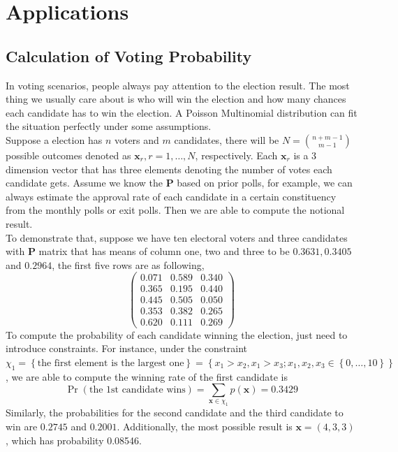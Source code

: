 \documentclass[12pt]{article}
\newcommand{\Pmat}{\mathbf{P}}
\newcommand{\xvec}{\boldsymbol{x}}
\begin{document}
\section{Applications}
\subsection{Calculation of Voting Probability}

  In voting scenarios, people always pay attention to the election result. The most thing we usually care about is who will win the election and how many chances each candidate has to win the election. A Poisson Multinomial distribution can fit the situation perfectly under some assumptions.\\

Suppose a election has $n$ voters and $m$ candidates, there will be $N = \binom{n+m-1}{m-1}$ possible outcomes denoted as $\boldsymbol{x}_r, r = 1, \dots, N$, respectively. Each $\xvec_r$ is a 3 dimension vector that has three elements denoting the number of votes each candidate gets. Assume we know the $\Pmat$ based on prior polls, for example, we can always estimate the approval rate of each candidate in a certain constituency from the monthly polls or exit polls. Then we are able to compute the notional result.\\

To demonstrate that, suppose we have ten electoral voters and three candidates with $\Pmat$ matrix that has means of column one, two and three to be $0.3631,0.3405$ and $0.2964$, the first five rows are as following,
\begin{equation*}
\begin{pmatrix}
0.071 & 0.589 & 0.340\\
0.365 & 0.195 & 0.440\\
0.445 & 0.505 & 0.050\\
0.353 & 0.382 & 0.265\\
0.620 & 0.111 & 0.269
    \end{pmatrix}
\end{equation*}
To compute the probability of each candidate winning the election, just need to introduce constraints. For instance, under the constraint $\chi_1 = \left\{\text{the first element is the largest one}\right\} = \left\{x_1>x_2, x_1>x_3; x_1, x_2,x_3 \in \left\{0,\dots,10\right\}\right\}$, we are able to compute the winning rate of the first candidate is
\begin{equation*}
\Pr(\text{the 1st candidate wins}) = \sum_{\boldsymbol{x} \in \chi_{1}} p(\boldsymbol{x}) = 0.3429
\end{equation*}
Similarly, the probabilities for the second candidate and the third candidate to win are $0.2745$ and $0.2001$. Additionally, the most possible result is $\boldsymbol{x} = (4,3,3)$, which has probability 0.08546.
\end{document}
